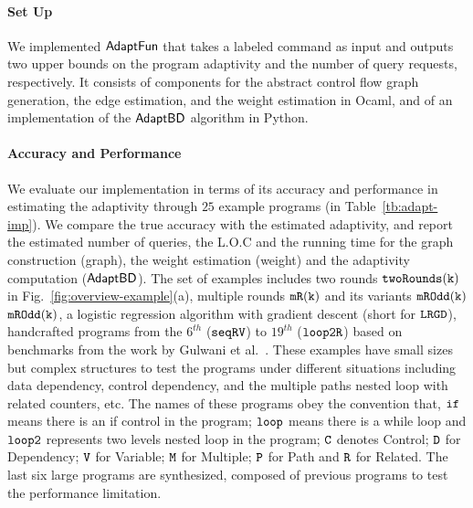 
\paragraph{Set Up}
We implemented $\textsf{AdaptFun}$ that takes a labeled command as input 
and outputs two upper bounds on the program adaptivity and the number of query requests, respectively.
It consists of components for the 
abstract control flow graph generation,
the edge estimation, and the weight estimation in Ocaml, 
and of an implementation of the $\mathsf{AdaptBD}$ algorithm in Python.


\paragraph{Accuracy and Performance}

We evaluate our implementation in terms of its accuracy and performance in estimating the adaptivity
through $25$ example programs (in Table~\ref{tb:adapt-imp}).
 We compare the true accuracy with the estimated adaptivity, and report the estimated number of queries, the L.O.C and the running time for the graph construction (graph), the weight estimation (weight) and the adaptivity computation ($\mathsf{AdaptBD}$).
The set of examples includes two rounds $\mathtt{twoRounds(k)}$ in
Fig.~\ref{fig:overview-example}(a), multiple rounds $ \mathtt{mR(k)}$ and its variants $\mathtt{mROdd(k)}$ $\mathtt{mROdd(k)}$,
a logistic regression algorithm with gradient descent (short for $\mathtt{LRGD}$),
handcrafted programs from the $6^{th}$ ($\mathtt{seqRV}$) to $19^{th}$ ($\mathtt{loop2R}$) based on benchmarks from the work by Gulwani et al.~\cite{GulwaniJK09}. These examples have small sizes but complex structures to test the programs under different situations including
data dependency, control dependency, and the multiple paths nested loop with related counters, etc. The names of these programs obey the convention that,
$\mathtt{if}$ means there is an if control in the program;
$\mathtt{loop}$ means there is a while loop and $\mathtt{loop2}$ represents two levels nested loop in the program;
$\mathtt{C}$ denotes Control;
$\mathtt{D}$ for Dependency; $\mathtt{V}$ for Variable;
$\mathtt{M}$ for Multiple; $\mathtt{P}$ for Path and $\mathtt{R}$ for Related.
The last six large programs are synthesized, composed of previous programs to test the performance limitation. 


